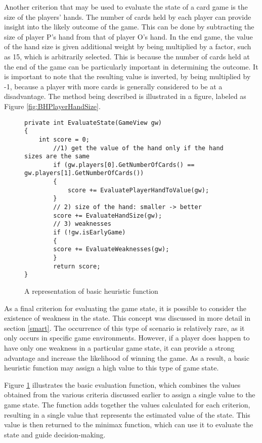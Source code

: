 Another criterion that may be used to evaluate the state of a card game is the size of the players' hands. The number of cards held by each player can provide insight into the likely outcome of the game. This can be done by subtracting the size of player P's hand from that of player O's hand. In the end game, the value of the hand size is given additional weight by being multiplied by a factor, such as 15, which is arbitrarily selected. This is because the number of cards held at the end of the game can be particularly important in determining the outcome. It is important to note that the resulting value is inverted, by being multiplied by -1, because a player with more cards is generally considered to be at a disadvantage. The method being described is illustrated in a figure, labeled as Figure \ref{fig:BHPlayerHandSize}.

\begin{figure}[h]
\captionsetup{justification=centering}
\begin{lstlisting}
private int EvaluateState(GameView gw)
{
	int score = 0;
    	//1) get the value of the hand only if the hand sizes are the same
    	if (gw.players[0].GetNumberOfCards() == gw.players[1].GetNumberOfCards())
    	{
    	    score += EvaluatePlayerHandToValue(gw);
    	}
    	// 2) size of the hand: smaller -> better 
    	score += EvaluateHandSize(gw);
    	// 3) weaknesses 
    	if (!gw.isEarlyGame)
    	{
       	score += EvaluateWeaknesses(gw);
    	}
    	return score;
}
\end{lstlisting}
\caption{A representation of basic heuristic function}
\label{fig:basicEval}
\end{figure}

As a final criterion for evaluating the game state, it is possible to consider the existence of weakness in the state. This concept was discussed in more detail in section \ref{smart}. The occurrence of this type of scenario is relatively rare, as it only occurs in specific game environments. However, if a player does happen to have only one weakness in a particular game state, it can provide a strong advantage and increase the likelihood of winning the game. As a result, a basic heuristic function may assign a high value to this type of game state.

Figure \ref{fig:basicEval} illustrates the basic evaluation function, which combines the values obtained from the various criteria discussed earlier to assign a single value to the game state. The function adds together the values calculated for each criterion, resulting in a single value that represents the estimated value of the state. This value is then returned to the minimax function, which can use it to evaluate the state and guide decision-making.

